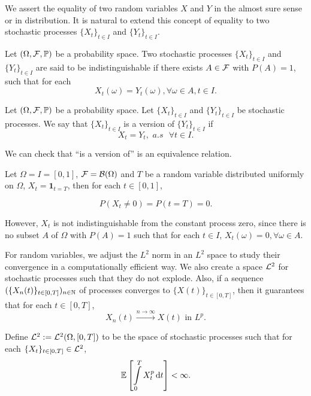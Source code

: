 We assert the equality of two random variables $X$ and $Y$ in the almost sure sense or in distribution. It is natural to extend this concept of equality to two stochastic processes $\{X_t\}_{t\in I}$ and $\{Y_t\}_{t\in I}$.

\begin{definition}
  Let $(\Omega, \mathcal{F}, \mathbb{P})$ be a probability space. Two stochastic processes $\{X_t\}_{t\in I}$ and $\{Y_t\}_{t\in I}$ are said to be indistinguishable  if there exists $A\in\mathcal{F}$ with $P(A)=1$, such that for each
  $$X_t(\omega)= Y_t(\omega), \forall \omega\in A, t\in I.$$
\end{definition}

\begin{definition}
  Let $(\Omega, \mathcal{F}, \mathbb{P})$ be a probability space. Let $\{X_t\}_{t\in I}$ and $\{Y_t\}_{t\in I}$ be stochastic processes. We say that $\{X_t\}_{t\in I}$ is a version of $\{Y_t\}_{t\in I}$ if
  $$X_t=Y_t,\,\, a.s \,\,\,\,\forall t\in I.$$
\end{definition}

\begin{remark}
  We can check that ``is a version of'' is an equivalence relation.
\end{remark}

\begin{example}
  \label{example:dis}
  Let $\Omega=I=[0,1]$, $\mathcal{F}=\mathcal{B}(\Omega)$ and $T$ be a random variable distributed uniformly on $\Omega$, $X_t=\mathbf{1}_{t=T}$, then for each $t\in[0,1]$,

  $$P(X_t\ne 0) = P(t=T) = 0.$$

  However, $X_t$ is not indistinguishable from the constant process zero, since there is no subset $A$ of $\Omega$ with $P(A)=1$ such that for each $t\in I$, $X_t(\omega)= 0, \forall \omega\in A.$
\end{example}

For random variables, we adjust the $L^2$ norm in an $L^2$ space to study their convergence in a computationally efficient way. We also create a space $\mathcal{L}^2$ for stochastic processes such that they do not explode. Also, if a sequence $(\{X_n(t)\}_{t\in[0,T]})_{n\in\mathbb{N}}$ of processes converges to $\{X(t)\}_{t\in[0,T]}$, then it guarantees that for each $t\in[0,T]$,
$$X_n(t) \xrightarrow{n\to\infty} X(t) \text{ in } L^p.$$

\begin{definition}
  Define $\mathcal{L}^2:=\mathcal{L}^2(\Omega, [0,T])$ to be the space of stochastic processes such that for each $\{X_t\}_{t\in [0,T]}\in \mathcal{L}^2$,
  $$\mathbb{E}\left[\int\limits_0^T X^p_t \,\mathrm{d} t\right] < \infty.$$
\end{definition}


